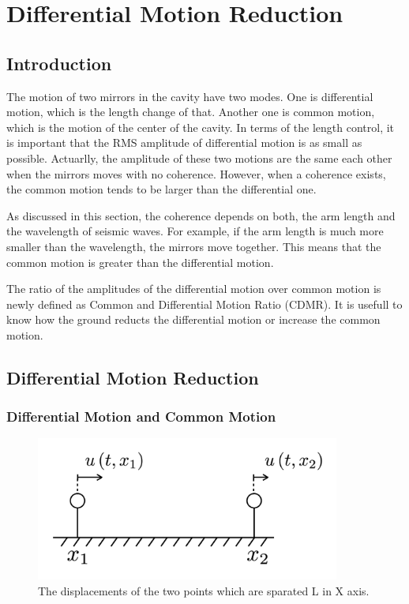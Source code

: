 \section{Differential Motion Reduction} \label{sec:33}
\subsection{Introduction}
The motion of two mirrors in the cavity have two modes. One is differential motion, which is the length change of that. Another one is common motion, which is the motion of the center of the cavity. In terms of the length control, it is important that the RMS amplitude of differential motion is as small as possible. Actuarlly, the amplitude of these two motions are the same each other when the mirrors moves with no coherence. However, when a coherence exists, the common motion tends to be larger than the differential one. 

As discussed in this section, the coherence depends on both, the arm length and the wavelength of seismic waves. For example, if the arm length is much more smaller than the wavelength, the mirrors move together. This means that the common motion is greater than the differential motion.

The ratio of the amplitudes of the differential motion over common motion is newly defined as Common and Differential Motion Ratio (CDMR). It is usefull to know how the ground reducts the differential motion or increase the common motion. 

\subsection{Differential Motion Reduction}
\subsubsection{Differential Motion and Common Motion}


\begin{figure}[h]
  \begin{center}
    \includegraphics[width=10.0cm]{./img_chap3/img315.png}
    \caption{The displacements of the two points which are sparated L in X axis. }
  \end{center}
\end{figure}


